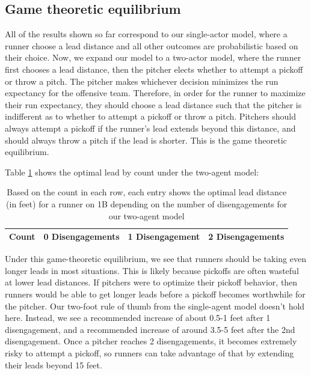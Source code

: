 \documentclass{article}
\begin{document}
      \subsection{Game theoretic equilibrium}

        All of the results shown so far correspond to our single-actor model, where a runner choose a lead distance and all other outcomes are probabilistic based on their choice. Now, we expand our model to a two-actor model, where the runner first chooses a lead distance, then the pitcher elects whether to attempt a pickoff or throw a pitch. The pitcher makes whichever decision minimizes the run expectancy for the offensive team. Therefore, in order for the runner to maximize their run expectancy, they should choose a lead distance such that the pitcher is indifferent as to whether to attempt a pickoff or throw a pitch. Pitchers should always attempt a pickoff if the runner's lead extends beyond this distance, and should always throw a pitch if the lead is shorter. This is the game theoretic equilibrium.


        Table \ref{tab:count-twoagent} shows the optimal lead by count under the two-agent model:

        \begin{table}
          \centering
          \begin{tabular}{c|ccc}
            Count & 0 Disengagements & 1 Disengagement & 2 Disengagements\\
            \hline
            
          \end{tabular}
          \caption{Based on the count in each row, each entry shows the optimal lead distance (in feet) for a runner on 1B depending on the number of disengagements for our two-agent model}
          \label{tab:count-twoagent}
        \end{table}

        Under this game-theoretic equilibrium, we see that runners should be taking even longer leads in most situations. This is likely because pickoffs are often wasteful at lower lead distances. If pitchers were to optimize their pickoff behavior, then runners would be able to get longer leads before a pickoff becomes worthwhile for the pitcher. Our two-foot rule of thumb from the single-agent model doesn't hold here. Instead, we see a recommended increase of about 0.5-1 feet after 1 disengagement, and a recommended increase of around 3.5-5 feet after the 2nd disengagement. Once a pitcher reaches 2 disengagements, it becomes extremely risky to attempt a pickoff, so runners can take advantage of that by extending their leads beyond 15 feet.
\end{document}
